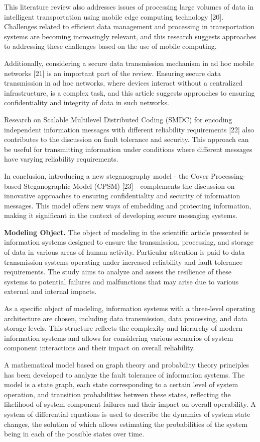 \begin{multicols}{2}
This literature review also addresses issues of processing large volumes
of data in intelligent transportation using mobile edge computing
technology {[}20{]}. Challenges related to efficient data management and
processing in transportation systems are becoming increasingly relevant,
and this research suggests approaches to addressing these challenges
based on the use of mobile computing.

Additionally, considering a secure data transmission mechanism in ad hoc
mobile networks {[}21{]} is an important part of the review. Ensuring
secure data transmission in ad hoc networks, where devices interact
without a centralized infrastructure, is a complex task, and this
article suggests approaches to ensuring confidentiality and integrity of
data in such networks.

Research on Scalable Multilevel Distributed Coding (SMDC) for encoding
independent information messages with different reliability requirements
{[}22{]} also contributes to the discussion on fault tolerance and
security. This approach can be useful for transmitting information under
conditions where different messages have varying reliability
requirements.

In conclusion, introducing a new steganography model - the Cover
Processing-based Steganographic Model (CPSM) {[}23{]} - complements the
discussion on innovative approaches to ensuring confidentiality and
security of information messages. This model offers new ways of
embedding and protecting information, making it significant in the
context of developing secure messaging systems.

{\bfseries Modeling Object.} The object of modeling in the scientific
article presented is information systems designed to ensure the
transmission, processing, and storage of data in various areas of human
activity. Particular attention is paid to data transmission systems
operating under increased reliability and fault tolerance requirements.
The study aims to analyze and assess the resilience of these systems to
potential failures and malfunctions that may arise due to various
external and internal impacts.

As a specific object of modeling, information systems with a three-level
operating architecture are chosen, including data transmission, data
processing, and data storage levels. This structure reflects the
complexity and hierarchy of modern information systems and allows for
considering various scenarios of system component interactions and their
impact on overall reliability.

A mathematical model based on graph theory and probability theory
principles has been developed to analyze the fault tolerance of
information systems. The model is a state graph, each state
corresponding to a certain level of system operation, and transition
probabilities between these states, reflecting the likelihood of system
component failures and their impact on overall operability. A system of
differential equations is used to describe the dynamics of system state
changes, the solution of which allows estimating the probabilities of
the system being in each of the possible states over time.
\end{multicols}

